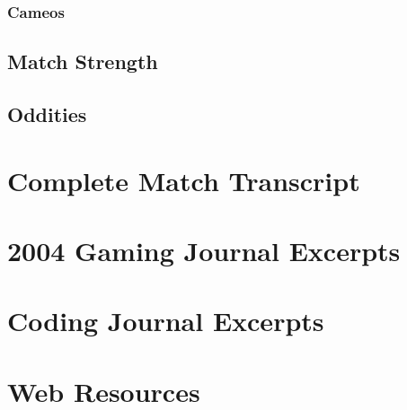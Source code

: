 \documentclass[a4paper,twoside,titlepage]{book}
\begin{document}
      \section{Cameos}
    \chapter{Match Strength}
    \chapter{Oddities}
  \appendix
  \part{Complete Match Transcript}
  \part{2004 Gaming Journal Excerpts}
  \part{Coding Journal Excerpts}
  \part{Web Resources}
  \clearpage
  \printindex
\end{document}
